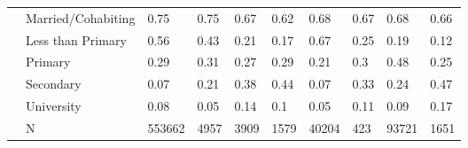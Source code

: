 \begin{table}[ht]
\begin{tabular}{l|l|llllllll}
   & Married/Cohabiting & 0.75 & 0.75 & 0.67 & 0.62 & 0.68 & 0.67 & 0.68 & 0.66 \\ 
   & Less than Primary & 0.56 & 0.43 & 0.21 & 0.17 & 0.67 & 0.25 & 0.19 & 0.12 \\ 
   & Primary & 0.29 & 0.31 & 0.27 & 0.29 & 0.21 & 0.3 & 0.48 & 0.25 \\ 
   & Secondary & 0.07 & 0.21 & 0.38 & 0.44 & 0.07 & 0.33 & 0.24 & 0.47 \\ 
   & University & 0.08 & 0.05 & 0.14 & 0.1 & 0.05 & 0.11 & 0.09 & 0.17 \\ 
   & N & 553662 & 4957 & 3909 & 1579 & 40204 & 423 & 93721 & 1651 \\ 
   \hline
\end{tabular}
\end{table}
